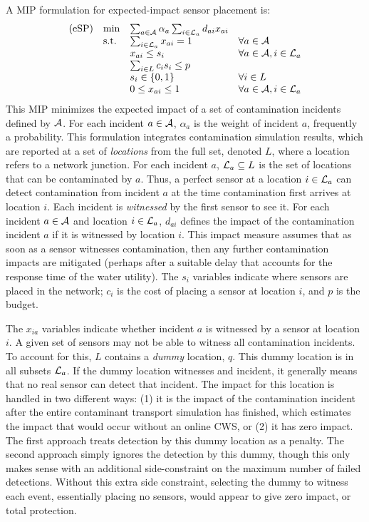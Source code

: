 A MIP formulation for expected-\/impact sensor placement is: \[ \label{eqn:SP} \begin{array}{llll} {\rm (eSP)} & \min & \sum_{a \in {\cal A}} \alpha_a \sum_{i \in {\cal L}_a} d_{ai} x_{ai} &\\ & {\rm s.t.} & \sum_{i\in {\cal L}_a} x_{ai} = 1 & \forall a \in {\cal A}\\ & & x_{ai} \le s_i & \forall a \in {\cal A}, i \in {\cal L}_a\\  & & \sum_{i \in L} c_i s_i \le p&\\ & & s_i \in \{0,1\} & \forall i \in L\\ & & 0 \leq x_{ai} \leq 1 & \forall a \in {\cal A}, i \in {\cal L}_a \end{array} \] This MIP minimizes the expected impact of a set of contamination incidents defined by ${\cal A}$. For each incident $a \in {\cal A}$, $\alpha_a$ is the weight of incident $a$, frequently a probability. This formulation integrates contamination simulation results, which are reported at a set of {\itshape locations\/} from the full set, denoted $L$, where a location refers to a network junction. For each incident $a$, ${\cal L}_a \subseteq L$ is the set of locations that can be contaminated by $a$. Thus, a perfect sensor at a location $i \in {\cal L}_a$ can detect contamination from incident $a$ at the time contamination first arrives at location $i$. Each incident is {\itshape witnessed\/} by the first sensor to see it. For each incident $a \in {\cal A}$ and location $i \in {\cal L}_a$, $d_{ai}$ defines the impact of the contamination incident $a$ if it is witnessed by location $i$. This impact measure assumes that as soon as a sensor witnesses contamination, then any further contamination impacts are mitigated (perhaps after a suitable delay that accounts for the response time of the water utility). The $s_i$ variables indicate where sensors are placed in the network; $c_i$ is the cost of placing a sensor at location $i$, and $p$ is the budget.


The $x_{ia}$ variables indicate whether incident $a$ is witnessed by a sensor at location $i$. A given set of sensors may not be able to witness all contamination incidents. To account for this, $L$ contains a {\itshape dummy\/} location, $q$. This dummy location is in all subsets ${\cal L}_a$. If the dummy location witnesses and incident, it generally means that no real sensor can detect that incident. The impact for this location is handled in two different ways: (1) it is the impact of the contamination incident after the entire contaminant transport simulation has finished, which estimates the impact that would occur without an online CWS, or (2) it has zero impact. The first approach treats detection by this dummy location as a penalty. The second approach simply ignores the detection by this dummy, though this only makes sense with an additional side-\/constraint on the maximum number of failed detections.  Without this extra side constraint, selecting the dummy to witness each event, essentially placing no sensors, would appear to give zero impact, or total protection.

